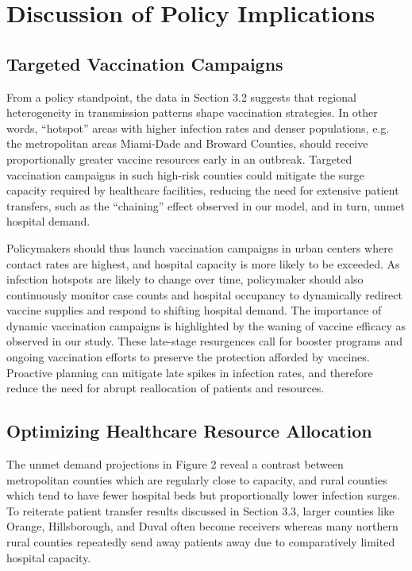 \documentclass{article}
\begin{document}
{\color{blue}
\section{Discussion of Policy Implications}
\subsection{Targeted Vaccination Campaigns}
From a policy standpoint, the data in Section 3.2 suggests that regional heterogeneity in transmission patterns shape vaccination strategies. In other words, “hotspot” areas with higher infection rates and denser populations, e.g. the metropolitan areas Miami-Dade and Broward Counties, should receive proportionally greater vaccine resources early in an outbreak. Targeted vaccination campaigns in such high-risk counties could mitigate the surge capacity required by healthcare facilities, reducing the need for extensive patient transfers, such as the “chaining” effect observed in our model, and in turn, unmet hospital demand. 

Policymakers should thus launch vaccination campaigns in urban centers where contact rates are highest, and hospital capacity is more likely to be exceeded.  As infection hotspots are likely to change over time, policymaker should also continuously monitor case counts and hospital occupancy to dynamically redirect vaccine supplies and respond to shifting hospital demand. The importance of dynamic vaccination campaigns is highlighted by the waning of vaccine efficacy as observed in our study. These late-stage resurgences call for booster programs and ongoing vaccination efforts to preserve the protection afforded by vaccines. Proactive planning can mitigate late spikes in infection rates, and therefore reduce the need for abrupt reallocation of patients and resources. 

\subsection{Optimizing Healthcare Resource Allocation} 
The unmet demand projections in Figure 2 reveal a contrast between metropolitan counties which are regularly close to capacity, and rural counties which tend to have fewer hospital beds but proportionally lower infection surges. To reiterate patient transfer results discussed in Section 3.3, larger counties like Orange, Hillsborough, and Duval often become receivers whereas many northern rural counties repeatedly send away patients away due to comparatively limited hospital capacity. 

}
\end{document}
